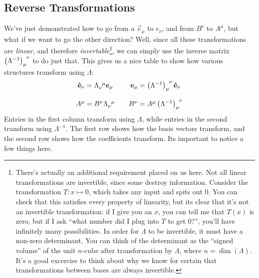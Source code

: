 \subsection{Reverse Transformations}
We've just demonstrated how to go from a $\vec{e}_\mu$ to $\unit{e}_\nu$, and from $B^\nu$ to $A^\mu$, but what if we want to go the other direction?
Well, since all these transformations are \emph{linear}, and therefore \emph{invertable}\footnote{There's actually an additional requirement placed on us here. Not all linear transformations are invertible, since some destroy information. Consider the transformation $T : x \mapsto 0$, which takes any input and spits out $0$. You can check that this satisfies every property of linearity, but its clear that it's not an invertible transformation: if I give you an $x$, you can tell me that $T(x)$ is zero, but if I ask ``what number did I plug into $T$ to get $0$?'', you'll have infinitely many possibilities. In order for $\Lambda$ to be invertible, it must have a non-zero determinant. You can think of the determinant as the ``signed volume'' of the unit $n$-cube after transformation by $\Lambda$, where $n = \dim(\Lambda)$. It's a good excercise to think about why we know for certain that transformations between bases are always invertible.}, we can simply use the inverse matrix $\tensor{\left(\Lambda^{-1}\right)}{_\mu^\nu}$ to do just that.
This gives us a nice table to show how various structures transform using $\Lambda$:
\[
    \begin{matrix}
        \unit{e}_\nu = \tensor{\Lambda}{_\nu^\mu} \vec{e}_\mu &  & \vec{e}_\mu = \tensor{\left(\Lambda^{-1}\right)}{_\mu^\nu}\unit{e}_\nu \\
        & & \\
         A^\mu = B^\nu\tensor{\Lambda}{_\nu^\mu} & & B^\nu = A^\mu \tensor{\left(\Lambda^{-1}\right)}{_\mu^\nu}
    \end{matrix}
\]
Entries in the first column transform using $\Lambda$, while entries in the second transform using $\Lambda^{-1}$.
The first row shows how the basis vectors transform, and the second row shows how the coefficients transform. 
Its important to notice a few things here.
